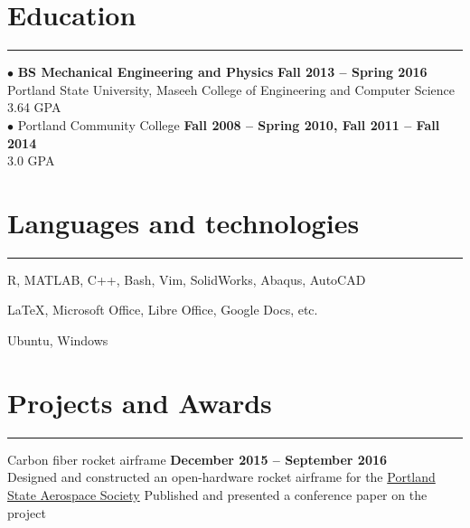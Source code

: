 \section{Education}
	\noindent\rule{\textwidth}{\hlinewidth}
	$\bullet$ \textbf{BS Mechanical Engineering and Physics}  \hfill\textbf{Fall 2013 -- Spring 2016}\\
		Portland State University, Maseeh College of Engineering and Computer Science\\
		3.64 GPA\\
	$\bullet$ Portland Community College  \hfill\textbf{Fall 2008 -- Spring 2010, Fall 2011 -- Fall 2014}\\
		3.0 GPA\\

\section{Languages and technologies}

\noindent\rule{\textwidth}{\hlinewidth}
    \begin{innerlist}
        \item R, MATLAB, C++, Bash, Vim, SolidWorks, Abaqus, AutoCAD
        \item \LaTeX, Microsoft Office, Libre Office, Google Docs, etc.
	\item Ubuntu, Windows
    \end{innerlist}

\section{Projects and Awards}
\noindent\rule{\textwidth}{\hlinewidth}
	\begin{innerlist}
	\item Carbon fiber rocket airframe	\hfill\textbf{December 2015 -- September 2016}\\%
		\subitem Designed and constructed an open-hardware rocket airframe for the \href{http://psas.pdx.edu/}{Portland State Aerospace Society}
		\subitem Published and presented a conference paper on the project
	\end{innerlist}

